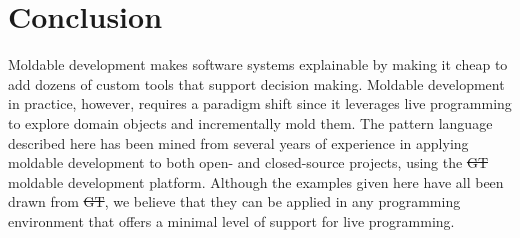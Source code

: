 \documentclass[sigconf]{acmart}
\newcommand{\GT}{\st{GT}\xspace} %
\begin{document}
\section{Conclusion}

Moldable development makes software systems explainable by making it cheap to add dozens of custom tools that support decision making.
Moldable development in practice, however, requires a paradigm shift since it leverages live programming to explore domain objects and incrementally mold them.
The pattern language described here has been mined from several years of experience in applying moldable development to both open- and closed-source projects, using the \GT moldable development platform.
Although the examples given here have all been drawn from \GT, we believe that they can be applied in any programming environment that offers a minimal level of support for live programming.



\end{document}
